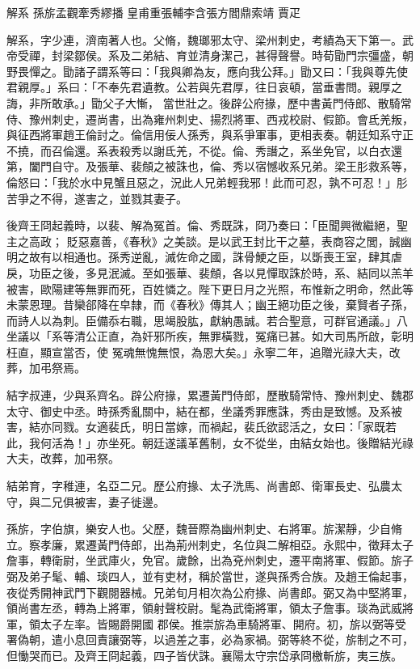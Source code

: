 
\begin{pinyinscope}
解系
 孫旂孟觀牽秀繆播
 皇甫重張輔李含張方閻鼎索靖
 賈疋



 解系，字少連，濟南著人也。父脩，魏瑯邪太守、梁州刺史，考績為天下第一。武帝受禪，封梁鄒侯。系及二弟結、育並清身潔己，甚得聲譽。時荀勖門宗彊盛，朝野畏憚之。勖諸子謂系等曰：「我與卿為友，應向我公拜。」勖又曰：「我與尊先使君親厚。」系曰：「不奉先君遺教。公若與先君厚，往日哀頓，當垂書問。親厚之誨，非所敢承。」勖父子大慚，
 當世壯之。後辟公府掾，歷中書黃門侍郎、散騎常侍、豫州刺史，遷尚書，出為雍州刺史、揚烈將軍、西戎校尉、假節。會氐羌叛，與征西將軍趙王倫討之。倫信用佞人孫秀，與系爭軍事，更相表奏。朝廷知系守正不撓，而召倫還。系表殺秀以謝氐羌，不從。倫、秀譖之，系坐免官，以白衣還第，闔門自守。及張華、裴頠之被誅也，倫、秀以宿憾收系兄弟。梁王肜救系等，倫怒曰：「我於水中見蟹且惡之，況此人兄弟輕我邪！此而可忍，孰不可忍！」肜苦爭之不得，遂害之，並戮其妻子。



 後齊王冏起義時，以裴、解為冤首。倫、秀既誅，冏乃奏曰：「臣聞興微繼絕，聖主之高政；
 貶惡嘉善，《春秋》之美談。是以武王封比干之墓，表商容之閭，誠幽明之故有以相通也。孫秀逆亂，滅佐命之國，誅骨鯁之臣，以斲喪王室，肆其虐戾，功臣之後，多見泯滅。至如張華、裴頠，各以見憚取誅於時，系、結同以羔羊被害，歐陽建等無罪而死，百姓憐之。陛下更日月之光照，布惟新之明命，然此等未蒙恩理。昔欒郤降在皁隸，而《春秋》傳其人；幽王絕功臣之後，棄賢者子孫，而詩人以為刺。臣備忝右職，思竭股肱，獻納愚誠。若合聖意，可群官通議。」八坐議以「系等清公正直，為奸邪所疾，無罪橫戮，冤痛已甚。如大司馬所啟，彰明枉直，顯宣當否，使
 冤魂無愧無恨，為恩大矣。」永寧二年，追贈光祿大夫，改葬，加弔祭焉。



 結字叔連，少與系齊名。辟公府掾，累遷黃門侍郎，歷散騎常恃、豫州刺史、魏郡太守、御史中丞。時孫秀亂關中，結在都，坐議秀罪應誅，秀由是致憾。及系被害，結亦同戮。女適裴氏，明日當嫁，而禍起，裴氏欲認活之，女曰：「家既若此，我何活為！」亦坐死。朝廷遂議革舊制，女不從坐，由結女始也。後贈結光祿大夫，改葬，加弔祭。



 結弟育，字稚連，名亞二兄。歷公府掾、太子洗馬、尚書郎、衛軍長史、弘農太守，與二兄俱被害，妻子徙邊。



 孫旂，字伯旗，樂安人也。父歷，魏晉際為幽州刺史、右將軍。旂潔靜，少自脩立。察孝廉，累遷黃門侍郎，出為荊州刺史，名位與二解相亞。永熙中，徵拜太子詹事，轉衛尉，坐武庫火，免官。歲餘，出為兗州刺史，遷平南將軍、假節。旂子弼及弟子髦、輔、琰四人，並有吏材，稱於當世，遂與孫秀合族。及趙王倫起事，夜從秀開神武門下觀閱器械。兄弟旬月相次為公府掾、尚書郎。弼又為中堅將軍，領尚書左丞，轉為上將軍，領射聲校尉。髦為武衛將軍，領太子詹事。琰為武威將軍，領太子左率。皆賜爵開國
 郡侯。推崇旂為車騎將軍、開府。初，旂以弼等受署偽朝，遣小息回責讓弼等，以過差之事，必為家禍。弼等終不從，旂制之不可，但慟哭而已。及齊王冏起義，四子皆伏誅。襄陽太守宗岱承冏檄斬旂，夷三族。




\end{pinyinscope}

